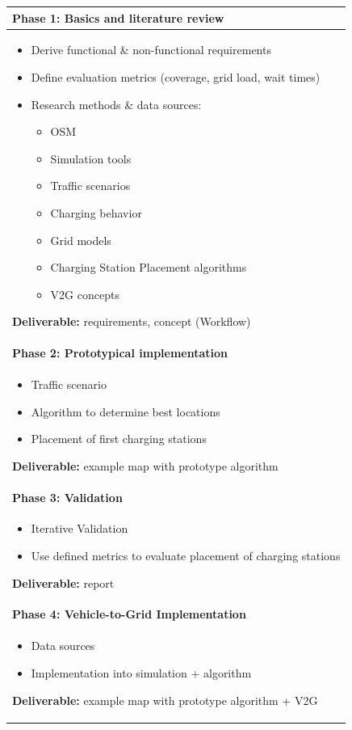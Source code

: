 \begin{longtable}{|p{}|}
\hline
\rowcolor{gray!20}
\textbf{Phase 1: Basics and literature review} \\
\hline
\begin{itemize}
\item Derive functional \& non-functional requirements
\item Define evaluation metrics (coverage, grid load, wait times)
\item Research methods \& data sources:
\begin{itemize}
\item \ac{OSM}
\item Simulation tools
\item Traffic scenarios
\item Charging behavior
\item Grid models
\item Charging Station Placement algorithms
\item \ac{V2G} concepts
\end{itemize}
\end{itemize}
\textbf{Deliverable:} requirements, concept (Workflow) \\
\hline

\rowcolor{gray!20}
\textbf{Phase 2: Prototypical implementation} \\
\hline
\begin{itemize}
\item Traffic scenario
\item Algorithm to determine best locations
\item Placement of first charging stations
\end{itemize}
\textbf{Deliverable:} example map with prototype algorithm \\
\hline

\rowcolor{gray!20}
\textbf{Phase 3: Validation} \\
\hline
\begin{itemize}
\item Iterative Validation
\item Use defined metrics to evaluate placement of charging stations
\end{itemize}
\textbf{Deliverable:} report \\
\hline

\rowcolor{gray!20}
\textbf{Phase 4: Vehicle-to-Grid Implementation} \\
\hline
\begin{itemize}
\item Data sources
\item Implementation into simulation + algorithm
\end{itemize}
\textbf{Deliverable:} example map with prototype algorithm + \ac{V2G} \\
\hline


\end{longtable}
